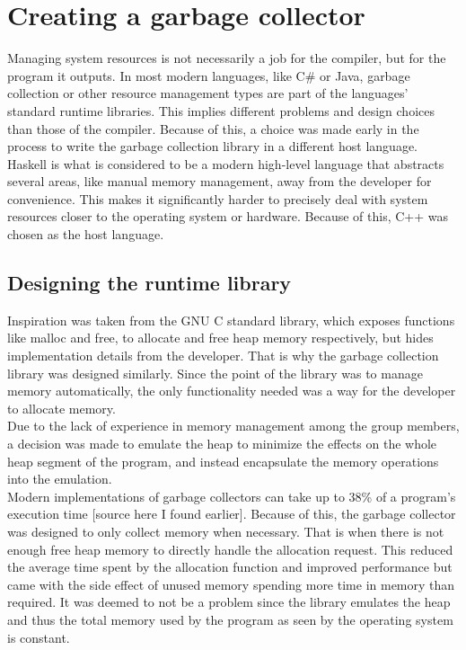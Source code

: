

\section{Creating a garbage collector}

Managing system resources is not necessarily a job for the compiler, but for the
program it outputs. In most modern languages, like C\# or Java, garbage collection
or other resource management types are part of the languages' standard runtime
libraries. This implies different problems and design choices than those of the
compiler. Because of this, a choice was made early in the process to write the
garbage collection library in a different host language. Haskell is what is considered
to be a modern high-level language that abstracts several areas, like manual memory
management, away from the
developer for convenience. This makes it significantly harder to precisely deal
with system resources closer to the operating system or hardware. Because of this,
C++ was chosen as the host language.

\subsection{Designing the runtime library}
Inspiration was taken from the GNU C standard library, which exposes functions
like malloc and free, to allocate and free heap memory respectively, but hides
implementation details from the developer. That is why the garbage collection
library was designed similarly. Since the point of the library was to manage
memory automatically, the only functionality needed was a way for the developer
to allocate memory.\\

Due to the lack of experience in memory management among the group members,
a decision was made to emulate the heap to minimize the effects on the whole
heap segment of the program, and instead encapsulate the memory operations
into the emulation.\\


Modern implementations of garbage
collectors can take up to 38\% of a program's execution time [source here I found earlier]. Because of this,
the garbage collector was designed to only collect memory when necessary. That is
when there is not enough free heap memory to directly handle the allocation request.
This reduced the average time spent by the allocation function and improved performance
but came with the side effect of unused memory spending more time in memory than
required. It was deemed to not be a problem since the library emulates the heap
and thus the total memory used by the program as seen by the operating system is
constant.

